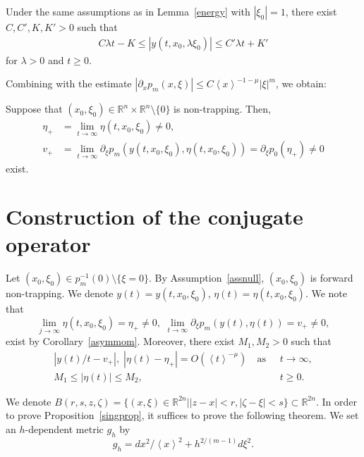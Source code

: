 \documentclass[AHL,Unicode,longabstracts,published]{cedram}
\renewcommand*\l{\lambda}
\newcommand*\m{\mu}
\newcommand*\x{\xi}
\newcommand*\y{\eta}
\newcommand*\z{\zeta}
\newcommand*\re{\mathbb{R}}
\newcommand*\pa{\partial}
\newcommand{\jap}[1]{\left\langle #1 \right\rangle}
\begin{document}
\begin{coro}
Under the same assumptions as in Lemma~\ref{energy} with $|\x_0|=1$, there exist $C,C',K,K'>0$ such that
\begin{align*}
C\l t -K\leq |y(t,x_0,\l\x_0)|\leq C'\l t+K'
\end{align*}
for $\l>0$ and $t\geq 0$.
\end{coro}

Combining with the estimate $|\pa_{x}p_m(x,\x)|\leq C\jap{x}^{-1-\m}|\x|^{m}$, we obtain:
\begin{coro}\label{asymmom}
Suppose that $(x_0,\x_0)\in \re^n\times \re^n\setminus\{0\}$ is non-trapping. Then,
\begin{align*}
\y_{+}&=\lim_{t\to\infty}\y(t,x_0,\x_0)\neq 0,\\
v_{+}&=\lim_{t\to\infty}\pa_{\x}p_m\left(y(t,x_0,\x_0),\y(t,x_0,\x_0)\right)=\pa_{\x}p_0(\y_+)\neq 0
\end{align*}
exist.
\end{coro}


\section{Construction of the conjugate operator}\label{appb}

Let $(x_0,\x_0)\in p_m^{-1}(0)\setminus\{\x= 0\}$. By Assumption~\ref{assnull}, $(x_0,\x_0)$ is forward non-trapping. We denote $y(t) = y(t, x_0, \x_0)$, $\y(t) = \y(t, x_0, \x_0)$. We note that
\[
\lim_{j\to\infty}\y(t,x_0,\x_0)=\y_+\neq 0,\,\, \lim_{t\to \infty} \pa_{\x}p_m(y(t),\y(t)) = v_+\neq 0,
\]
exist by Corollary~\ref{asymmom}. Moreover, there exist $M_1, M_2>0$ such that
\begin{equation}\label{cl}
\begin{aligned}
|y(t)/t-v_+|,\; |\y(t)-\y_+|=O(\jap{t}^{-\m})\quad\text{as }\;&t\to\infty,\\
M_1\leq|\y(t)|\leq M_2,\quad &t\geq 0.
\end{aligned}
\end{equation}

We denote $B(r,s,z,\z) = \{(x,\x)\in \re^{2n}| |z-x| < r, |\z -\x| < s\}\subset \re^{2n}$. In order to prove Proposition~\ref{singprop}, it suffices to prove the following theorem. We set an $h$-dependent metric $g_h$ by
\[
g_h = dx^2/\jap{x}^2+h^{2/(m-1)}d\x^2.
\]
\end{document}
